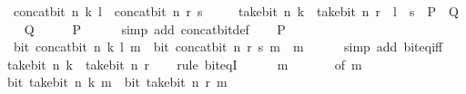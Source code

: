 \begin{isabellebody}
\ \ {\isacartoucheopen}concat{\isacharunderscore}{\kern0pt}bit\ n\ k\ l\ {\isacharequal}{\kern0pt}\ concat{\isacharunderscore}{\kern0pt}bit\ n\ r\ s\isanewline
\ \ \ \ {\isasymlongleftrightarrow}\ take{\isacharunderscore}{\kern0pt}bit\ n\ k\ {\isacharequal}{\kern0pt}\ take{\isacharunderscore}{\kern0pt}bit\ n\ r\ {\isasymand}\ l\ {\isacharequal}{\kern0pt}\ s{\isacartoucheclose}\ {\isacharparenleft}{\kern0pt}\ {\isacartoucheopen}{\isacharquery}{\kern0pt}P\ {\isasymlongleftrightarrow}\ {\isacharquery}{\kern0pt}Q{\isacartoucheclose}{\isacharparenright}{\kern0pt}\isanewline
%
\isadelimproof
%
\endisadelimproof
%
\isatagproof
{}\isamarkupfalse%
\isanewline
\ \ \isamarkupfalse%
\ {\isacharquery}{\kern0pt}Q\isanewline
\ \ \isamarkupfalse%
\ \isamarkupfalse%
\ {\isacharquery}{\kern0pt}P\isanewline
\ \ \ \ \isamarkupfalse%
\ {\isacharparenleft}{\kern0pt}simp\ add{\isacharcolon}{\kern0pt}\ concat{\isacharunderscore}{\kern0pt}bit{\isacharunderscore}{\kern0pt}def{\isacharparenright}{\kern0pt}\isanewline
{}\isamarkupfalse%
\isanewline
\ \ \isamarkupfalse%
\ {\isacharquery}{\kern0pt}P\isanewline
\ \ \isamarkupfalse%
\ \isamarkupfalse%
\ {\isacharasterisk}{\kern0pt}{\isacharcolon}{\kern0pt}\ {\isacartoucheopen}bit\ {\isacharparenleft}{\kern0pt}concat{\isacharunderscore}{\kern0pt}bit\ n\ k\ l{\isacharparenright}{\kern0pt}\ m\ {\isacharequal}{\kern0pt}\ bit\ {\isacharparenleft}{\kern0pt}concat{\isacharunderscore}{\kern0pt}bit\ n\ r\ s{\isacharparenright}{\kern0pt}\ m{\isacartoucheclose}\ \ m\isanewline
\ \ \ \ \isamarkupfalse%
\ {\isacharparenleft}{\kern0pt}simp\ add{\isacharcolon}{\kern0pt}\ bit{\isacharunderscore}{\kern0pt}eq{\isacharunderscore}{\kern0pt}iff{\isacharparenright}{\kern0pt}\isanewline
\ \ \isamarkupfalse%
\ {\isacartoucheopen}take{\isacharunderscore}{\kern0pt}bit\ n\ k\ {\isacharequal}{\kern0pt}\ take{\isacharunderscore}{\kern0pt}bit\ n\ r{\isacartoucheclose}\isanewline
\ \ \isamarkupfalse%
\ {\isacharparenleft}{\kern0pt}rule\ bit{\isacharunderscore}{\kern0pt}eqI{\isacharparenright}{\kern0pt}\isanewline
\ \ \ \ \isamarkupfalse%
\ m\isanewline
\ \ \ \ \isamarkupfalse%
\ {\isacharasterisk}{\kern0pt}\ {\isacharbrackleft}{\kern0pt}of\ m{\isacharbrackright}{\kern0pt}\isanewline
\ \ \ \ \isamarkupfalse%
\ {\isacartoucheopen}bit\ {\isacharparenleft}{\kern0pt}take{\isacharunderscore}{\kern0pt}bit\ n\ k{\isacharparenright}{\kern0pt}\ m\ {\isasymlongleftrightarrow}\ bit\ {\isacharparenleft}{\kern0pt}take{\isacharunderscore}{\kern0pt}bit\ n\ r{\isacharparenright}{\kern0pt}\ m{\isacartoucheclose}\isanewline

\end{isabellebody}

